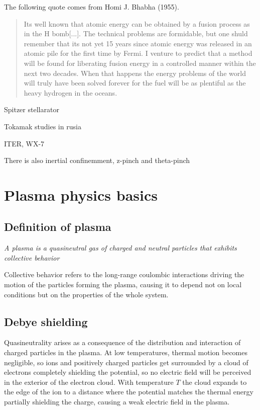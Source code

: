 \documentclass[smallextended]{svjour3}
\newtheorem{definition}
\begin{document}
The following quote comes from Homi J. Bhabha (1955).

\begin{quote}
    Its well known that atomic energy can be obtained by a fusion process as in the H bomb[...]. The technical problems are formidable, but one shuld remember that its not yet 15 years since atomic energy was released in an atomic pile for the first time by Fermi. I venture to predict that a method will be found for liberating fusion energy in a controlled manner within the next two decades. When that happens the energy problems of the world will truly have been solved forever for the fuel will be as plentiful as the heavy hydrogen in the oceans.
\end{quote}

Spitzer stellarator

Tokamak studies in rusia

ITER, WX-7

There is also inertial confinemment, z-pinch and theta-pinch

\section{Plasma physics basics}

\subsection{Definition of plasma}

\begin{definition}
\textit{A plasma is a quasineutral gas of charged and neutral particles that exhibits collective behavior}
\end{definition}

Collective behavior refers to the long-range coulombic interactions driving the motion of the particles forming the plasma, causing it to depend not on local conditions but on the properties of the whole system. 

\subsection{Debye shielding}

Quasineutrality arises as a consequence of the distribution and interaction of charged particles in the plasma. At low temperatures, thermal motion becomes negligible, so ions and positively charged particles get surrounded by a cloud of electrons completely shielding the potential, so no electric field will be perceived in the exterior of the electron cloud. With temperature $T$ the cloud expands to the edge of the ion to a distance where the potential matches the thermal energy partially shielding the charge, causing a weak electric field in the plasma.
\end{document}
